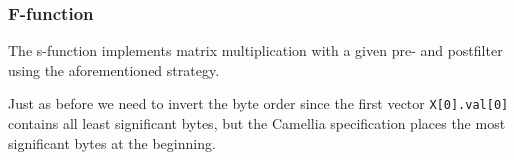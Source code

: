 \subsubsection{F-function}

The s-function implements matrix multiplication with a given pre- and
postfilter using the aforementioned strategy.



Just as before we need to invert the byte order since the first vector
\texttt{X[0].val[0]} contains all least significant bytes, but the Camellia
specification places the most significant bytes at the beginning.


